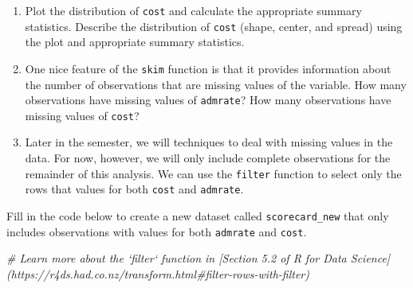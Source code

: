 \documentclass[]{book}
\newenvironment{Shaded}{\begin{snugshade}}{\end{snugshade}}
\newcommand{\KeywordTok}[1]{\textcolor[rgb]{0.13,0.29,0.53}{\textbf{#1}}}
\newcommand{\StringTok}[1]{\textcolor[rgb]{0.31,0.60,0.02}{#1}}
\newcommand{\CommentTok}[1]{\textcolor[rgb]{0.56,0.35,0.01}{\textit{#1}}}
\newcommand{\OperatorTok}[1]{\textcolor[rgb]{0.81,0.36,0.00}{\textbf{#1}}}
\newcommand{\NormalTok}[1]{#1}
\begin{document}
\begin{Shaded}
\end{Shaded}

\begin{enumerate}
\def\labelenumi{\arabic{enumi}.}
\setcounter{enumi}{2}
\item
  Plot the distribution of \texttt{cost} and calculate the appropriate
  summary statistics. Describe the distribution of \texttt{cost} (shape,
  center, and spread) using the plot and appropriate summary statistics.
\item
  One nice feature of the \texttt{skim} function is that it provides
  information about the number of observations that are missing values
  of the variable. How many observations have missing values of
  \texttt{admrate}? How many observations have missing values of
  \texttt{cost}?
\item
  Later in the semester, we will techniques to deal with missing values
  in the data. For now, however, we will only include complete
  observations for the remainder of this analysis. We can use the
  \texttt{filter} function to select only the rows that values for both
  \texttt{cost} and \texttt{admrate}.
\end{enumerate}

Fill in the code below to create a new dataset called
\texttt{scorecard\_new} that only includes observations with values for
both \texttt{admrate} and \texttt{cost}.

\begin{Shaded}
\end{Shaded}

\begin{Shaded}
\begin{Highlighting}[]
\CommentTok{# Learn more about the `filter` function in [Section 5.2 of R for Data Science] (https://r4ds.had.co.nz/transform.html#filter-rows-with-filter)}
\end{Highlighting}
\end{Shaded}
\end{document}
